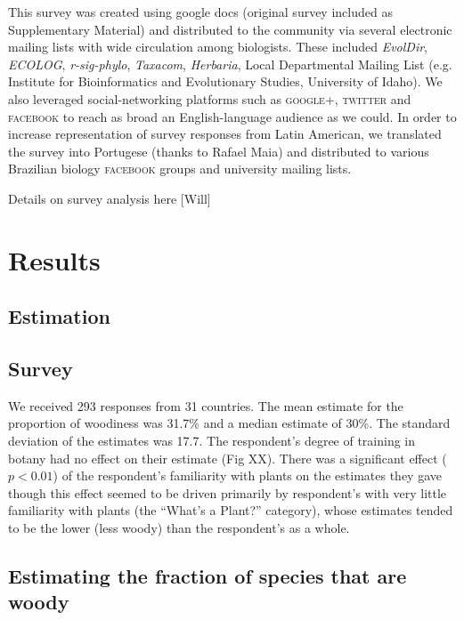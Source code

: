 \documentclass[12pt]{article}
\begin{document}
This survey was created using google docs (original survey included as Supplementary Material) and distributed to the community via several electronic mailing lists with wide circulation among biologists. These included \emph{EvolDir}, \emph{ECOLOG}, \emph{r-sig-phylo}, \emph{Taxacom}, \emph{Herbaria}, Local Departmental Mailing List (e.g. Institute for Bioinformatics and Evolutionary Studies, University of Idaho). We also leveraged social-networking platforms such as \textsc{google+}, \textsc{twitter} and \textsc{facebook} to reach as broad an English-language audience as we could. In order to increase representation of survey responses from Latin American, we translated the survey into Portugese (thanks to Rafael Maia) and distributed to various Brazilian biology \textsc{facebook} groups and university mailing lists.

Details on survey analysis here [Will]


\section{Results}

\subsection{Estimation}

\subsection{Survey}

We received 293 responses from 31 countries. The mean estimate for the proportion of woodiness was 31.7\% and a median estimate of 30\%. The standard deviation of the estimates was 17.7. The respondent's degree of training in botany had no effect on their estimate (Fig XX). There was a significant effect ($p<0.01$) of the respondent's  familiarity with plants on the estimates they gave though this effect seemed to be driven primarily by respondent's with very little familiarity with plants (the ``What's a Plant?'' category), whose estimates tended to be the lower (less woody) than the respondent's as a whole.

\subsection{Estimating the fraction of species that are woody}

\end{document}
